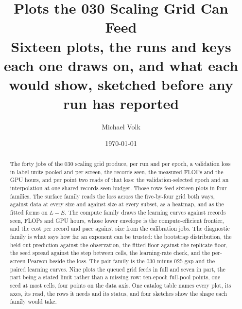 \documentclass[10pt,a4paper]{article}
\title{\vspace{-1.5em}Plots the 030 Scaling Grid Can Feed\\
  {\large Sixteen plots, the runs and keys each one draws on, and what each
   would show, sketched before any run has reported}}
\author{Michael Volk}
\date{\today}
\begin{document}
\maketitle
\thispagestyle{empty}

\begin{abstract}
\noindent
The forty jobs of the 030 scaling grid produce, per run and per epoch, a
validation loss in label units pooled and per screen, the records seen, the
measured FLOPs and the GPU hours, and per point two reads of that loss: the
validation-selected epoch and an interpolation at one shared records-seen budget.
Those rows feed sixteen plots in four families. The surface family reads the
loss across the five-by-four grid both ways, against data at every size and
against size at every subset, as a heatmap, and as the fitted forms on $L - E$.
The compute family draws the learning curves against records seen, FLOPs and GPU
hours, whose lower envelope is the compute-efficient frontier, and the cost per
record and pace against size from the calibration jobs. The diagnostic family is
what says how far an exponent can be trusted: the bootstrap distribution, the
held-out prediction against the observation, the fitted floor against the
replicate floor, the seed spread against the step between cells, the
learning-rate check, and the per-screen Pearson beside the loss. The pair family
is the 030 minus 025 gap and the paired learning curves. Nine plots the queued
grid feeds in full and seven in part, the part being a stated limit rather than a
missing row: ten-epoch full-pool points, one seed at most cells, four points on
the data axis. One catalog table names every plot, its axes, its read, the rows it
needs and its status, and four sketches show the shape each family would take.
\end{abstract}

\vspace{0.5em}
\tccontents
\clearpage







\end{document}
